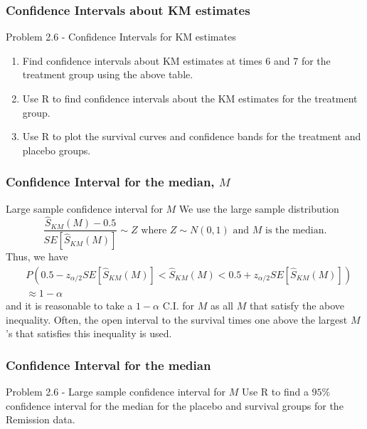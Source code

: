 \documentclass{beamer}
\theoremstyle{definition}
\begin{document}
\begin{frame}
\frametitle{Confidence Intervals about KM estimates}
\begin{block}{Problem 2.6 - Confidence Intervals for KM estimates}
\begin{enumerate}
\item Find confidence intervals about KM estimates at times 6 and 7 for the treatment group using the above table.
\item Use R to find confidence intervals about the KM estimates for the treatment group.
\item Use R to plot the survival curves and confidence bands for the treatment and placebo groups.
\end{enumerate}
\end{block}
\end{frame}
\begin{frame}
\frametitle{Confidence Interval for the median, $M$}
\begin{block}{Large sample confidence interval for $M$}
We use the large sample distribution
\[ \frac{\hat{S}_{KM}(M) - 0.5}{SE[\hat{S}_{KM}(M)]} \sim Z \text{ where } Z \sim N(0,1) \text { and } M \text{ is the median.}
\]
Thus, we have
\begin{align*}
&P(0.5 - z_{\alpha/2}SE[\hat{S}_{KM}(M)] <  \hat{S}_{KM}(M) < 0.5 + z_{\alpha/2}SE[\hat{S}_{KM}(M)]) \\
&\approx 1-\alpha
\end{align*}
and it is reasonable to take a $1-\alpha$ C.I. for $M$ as all $M$ that satisfy the above inequality. Often, the open interval to the survival times one above the largest $M$'s that satisfies this inequality is used.
\end{block}
\end{frame}


\begin{frame}
\frametitle{Confidence Interval for the median}
\begin{block}{Problem 2.6 - Large sample confidence interval for $M$}
Use R to find a $95\%$ confidence interval for the median for the placebo and survival groups for the Remission data.
\end{block}
\end{frame}
\end{document}
